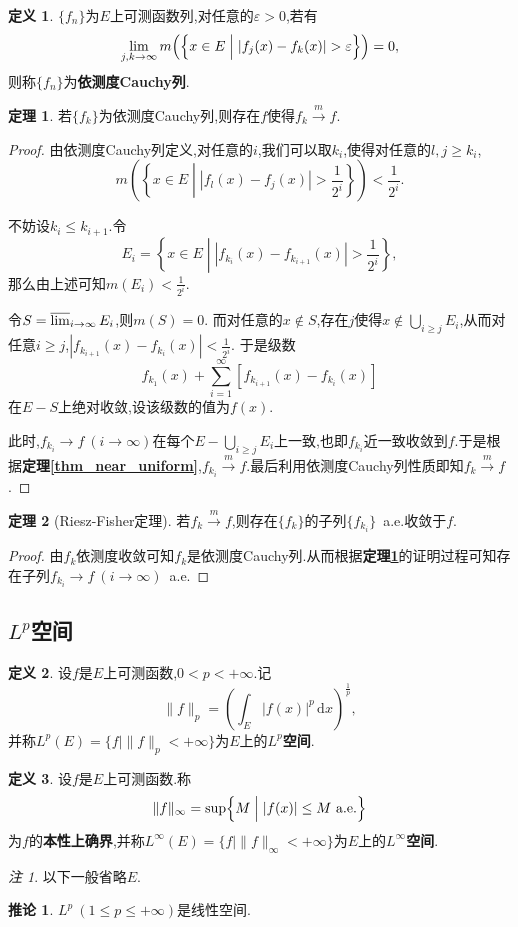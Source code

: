 \documentclass{ctexart}
\theoremstyle{definition}
\newtheorem{definition}{定义}
\newtheorem{theorem}{定理}
\newtheorem{corollary}{推论}
\theoremstyle{remark}
\newtheorem*{remark}{注}
\begin{document}
	\begin{definition}
		$\{f_n\}$为$E$上可测函数列,对任意的$\varepsilon>0$,若有
		$$\lim_{j,k\to\infty}{m\Bigl(\Bigl\{x\in E\Bigm| |f_j(x)-f_k(x)|>\varepsilon\Bigr\}\Bigr)}=0,$$
		则称$\{f_n\}$为\textbf{依测度Cauchy列}.
	\end{definition}
	\begin{theorem}\label{thm_measure_cauchy}
		若$\{f_k\}$为依测度Cauchy列,则存在$f$使得$f_k\xrightarrow{m}f$.
	\end{theorem}
	\begin{proof}
		由依测度Cauchy列定义,对任意的$i$,我们可以取$k_i$,使得对任意的$l,j\ge k_i$,
		$$m\left(\left\{x\in E\middle| |f_l(x)-f_j(x)|>\frac{1}{2^i}\right\}\right)
		<\frac{1}{2^i}.$$
		
		不妨设$k_i\le k_{i+1}$.令
		$$E_i=\left\{x\in E\middle| |f_{k_i}(x)-f_{k_{i+1}}(x)|>\frac{1}{2^i}\right\},$$
		那么由上述可知$m(E_i)<\frac{1}{2^i}$.
		
		令$S=\varlimsup_{i\to\infty}{E_i}$,则$m(S)=0$.
		而对任意的$x\notin S$,存在$j$使得$x\notin\bigcup_{i\ge j}{E_i}$,从而对任意$i\ge j$,$|f_{k_{i+1}}(x)-f_{k_i}(x)|<\frac{1}{2^i}$.
		于是级数
		$$f_{k_1}(x)+\sum_{i=1}^\infty{\left[f_{k_{i+1}}(x)-f_{k_i}(x)\right]}$$
		在$E-S$上绝对收敛,设该级数的值为$f(x)$.
		
		此时,$f_{k_i}\to f\ (i\to\infty)$在每个$E-\bigcup_{i\ge j}{E_i}$上一致,也即$f_{k_i}$近一致收敛到$f$.于是根据\textbf{定理\ref{thm_near_uniform}},$f_{k_i}\xrightarrow{m}f$.最后利用依测度Cauchy列性质即知$f_k\xrightarrow{m}f$.
	\end{proof}
	\begin{theorem}[Riesz-Fisher定理]
		若$f_k\xrightarrow{m}f$,则存在$\{f_k\}$的子列$\{f_{k_i}\}$\ a.e.收敛于$f$.
	\end{theorem}
	\begin{proof}
		由$f_k$依测度收敛可知$f_k$是依测度Cauchy列.从而根据\textbf{定理\ref{thm_measure_cauchy}}的证明过程可知存在子列$f_{k_i}\to f\ (i\to\infty)$\ a.e.
	\end{proof}
	
	\subsection{$L^p$空间}
	
	\begin{definition}
		设$f$是$E$上可测函数,$0<p<+\infty$.记
		$$\|f\|_p=\left(\int_E{|f(x)|^p\,\mathrm{d}x}\right)^\frac{1}{p},$$
		并称$L^p(E)=\{f\mid\|f\|_p<+\infty\}$为$E$上的\textbf{$L^p$空间}.
	\end{definition}
	\begin{definition}
		设$f$是$E$上可测函数.称
		$$\|f\|_\infty=\sup\Bigl\{M\Bigm| |f(x)|\le M\ \mbox{a.e.}\Bigr\}$$
		为$f$的\textbf{本性上确界},并称$L^\infty(E)=\{f\mid\|f\|_\infty<+\infty\}$为$E$上的\textbf{$L^\infty$空间}.
	\end{definition}
	\begin{remark}
		以下一般省略$E$.
	\end{remark}
	\begin{corollary}
		$L^p\ (1\le p\le+\infty)$是线性空间.
	\end{corollary}
	
\end{document}
